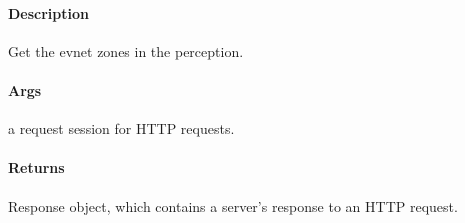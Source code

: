 \documentclass[letterpaper,10pt,english]{sphinxmanual}
\begin{document}
\begin{fulllineitems}
\label{\detokenize{gemini_lidar_hub_API:gemini_lidar_hub_API.get_lidar_hub_event_zones}}
\pysigstartsignatures
{}
\pysigstopsignatures

\paragraph{Description}
\label{\detokenize{gemini_lidar_hub_API:id23}}
\sphinxAtStartPar
Get the evnet zones in the perception.


\paragraph{Args}
\label{\detokenize{gemini_lidar_hub_API:id24}}\begin{description}
\sphinxAtStartPar
a request session for HTTP requests.

\end{description}


\paragraph{Returns}
\label{\detokenize{gemini_lidar_hub_API:id25}}\begin{description}
\sphinxAtStartPar
Response object, which contains a server’s response to an HTTP request.

\end{description}

\end{fulllineitems}

\end{document}
